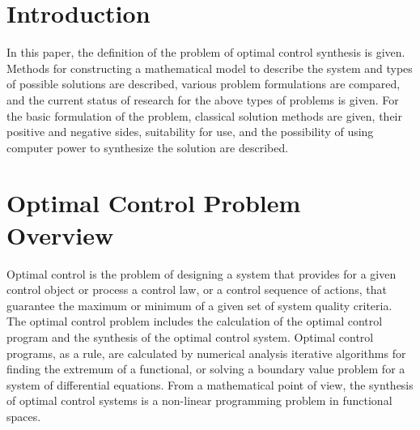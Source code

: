 

\usepackage[utf8]{inputenc}                %
\usepackage[british]{babel}  %
\usepackage[pdftex]{graphicx}              %

\setlength{\parindent}{0pt}
\setlength{\parskip}{1em}


    
    \tableofcontents
    \clearpage
    \section{Introduction}
    In this paper, the definition of the problem of optimal control synthesis is given. Methods for constructing a mathematical model to describe the system and types of possible solutions are described, various problem formulations are compared, and the current status of research for the above types of problems is given.
    For the basic formulation of the problem, classical solution methods are given, their positive and negative sides, suitability for use, and the possibility of using computer power to synthesize the solution are described.

    \section{Optimal Control Problem Overview}
    Optimal control is the problem of designing a system that provides for a given control object or process a control law, or a control sequence of actions, that guarantee the maximum or minimum of a given set of system quality criteria.
    The optimal control problem includes the calculation of the optimal control program and the synthesis of the optimal control system.
    Optimal control programs, as a rule, are calculated by numerical analysis iterative algorithms for finding the extremum of a functional, or solving a boundary value problem for a system of differential equations.
    From a mathematical point of view, the synthesis of optimal control systems is a non-linear programming problem in functional spaces.


